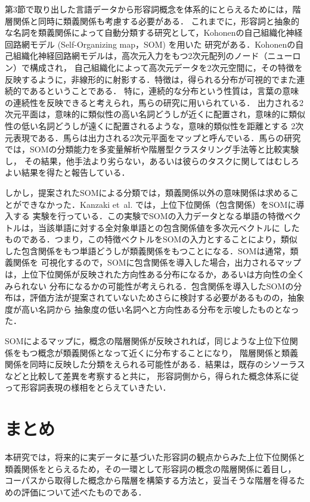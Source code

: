 \documentclass[japanese]{jnlp_1.4}
\begin{document}
第3節で取り出した言語データから形容詞概念を体系的にとらえるためには，階層関係と同時に類義関係も考慮する必要がある．
これまでに，形容詞と抽象的な名詞を類義関係によって自動分類する研究として，Kohonenの自己組織化神経回路網モデル (Self-Organizing map，SOM) を用いた
研究がある\cite{Article_28,Article_21}．Kohonenの自己組織化神経回路網モデルは，高次元入力をもつ2次元配列のノード（ニューロン）で構成され，
自己組織化によって高次元データを2次元空間に，その特徴を反映するように，非線形的に射影する．特徴は，得られる分布が可視的でまた連続的であるということである．
特に，連続的な分布という性質は，言葉の意味の連続性を反映できると考えられ，馬らの研究に用いられている．
出力される2次元平面は，意味的に類似性の高い名詞どうしが近くに配置され，意味的に類似性の低い名詞どうしが遠くに配置されるような，意味的類似性を距離とする
2次元表現である．馬らは出力される2次元平面をマップと呼んでいる．馬らの研究では，SOMの分類能力を多変量解析や階層型クラスタリング手法等と比較実験し，
その結果，他手法より劣らない，あるいは彼らのタスクに関してはむしろよい結果を得たと報告している．

しかし，提案されたSOMによる分類では，類義関係以外の意味関係は求めることができなかった．Kanzaki et~al. では，上位下位関係（包含関係）をSOMに導入する
実験を行っている\cite{Inproc_14}．この実験でSOMの入力データとなる単語の特徴ベクトルは，当該単語に対する全対象単語との包含関係値を多次元ベクトルに
したものである．つまり，この特徴ベクトルをSOMの入力とすることにより，類似した包含関係をもつ単語どうしが類義関係をもつことになる．SOMは通常，類義関係を
可視化するので，SOMに包含関係を導入した場合，出力されるマップは，上位下位関係が反映された方向性ある分布になるか，あるいは方向性の全くみられない
分布になるかの可能性が考えられる．包含関係を導入したSOMの分布は，評価方法が提案されていないためさらに検討する必要があるものの，抽象度が高い名詞から
抽象度の低い名詞へと方向性ある分布を示唆したものとなった．

SOMによるマップに，概念の階層関係が反映されれば，同じような上位下位関係をもつ概念が類義関係となって近くに分布することになり，
階層関係と類義関係を同時に反映した分類をえられる可能性がある．結果は，既存のシソーラスなどと比較して差異を考察すると共に，
形容詞側から，得られた概念体系に従って形容詞表現の様相をとらえていきたい．



\section{まとめ}

本研究では，将来的に実データに基づいた形容詞の観点からみた上位下位関係と類義関係をとらえるため，その一環として形容詞の概念の階層関係に着目し，
コーパスから取得した概念から階層を構築する方法と，妥当そうな階層を得るための評価について述べたものである．
\end{document}
